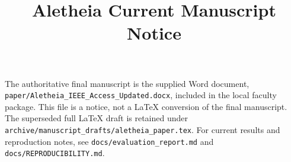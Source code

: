 \documentclass{article}
\title{Aletheia Current Manuscript Notice}
\date{}
\begin{document}
\maketitle
The authoritative final manuscript is the supplied Word document,
\texttt{paper/Aletheia\_IEEE\_Access\_Updated.docx}, included in the local faculty package.
This file is a notice, not a LaTeX conversion of the final manuscript.
The superseded full LaTeX draft is retained under
\texttt{archive/manuscript\_drafts/aletheia\_paper.tex}.
For current results and reproduction notes, see
\texttt{docs/evaluation\_report.md} and \texttt{docs/REPRODUCIBILITY.md}.
\end{document}
